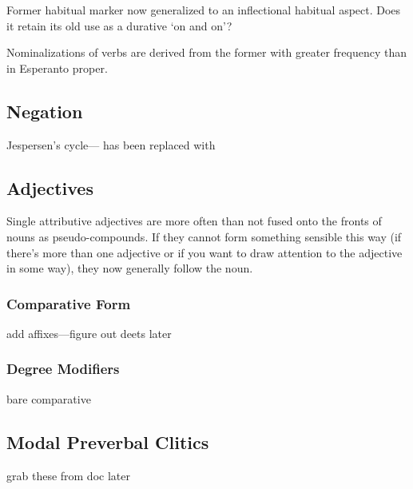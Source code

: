 Former habitual marker now generalized to an inflectional habitual aspect. 
Does it retain its old use as a durative `on and on'?

Nominalizations of verbs are derived from the former  with greater frequency than in Esperanto proper.

\subsection{Negation}

Jespersen's cycle--- has been replaced with 

\subsection{Adjectives}

Single attributive adjectives are more often than not fused onto the fronts of nouns as pseudo-compounds. If they cannot form something sensible this way (if there's more than one adjective or if you want to draw attention to the adjective in some way), they now generally follow the noun.

\subsubsection{Comparative Form}

add affixes---figure out deets later

\subsubsection{Degree Modifiers}

bare comparative

\subsection{Modal Preverbal Clitics}

grab these from doc later
